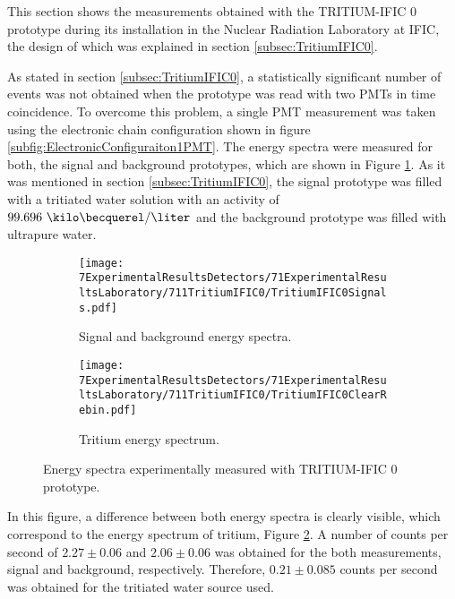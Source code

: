 This section shows the measurements obtained with the TRITIUM-IFIC 0 prototype during its installation in the Nuclear Radiation Laboratory at IFIC, the design of which was explained in section \ref{subsec:TritiumIFIC0}.

As stated in section \ref{subsec:TritiumIFIC0}, a statistically significant number of events was not obtained when the prototype was read with two PMTs in time coincidence. To overcome this problem, a single PMT measurement was taken using the electronic chain configuration shown in figure \ref{subfig:ElectronicConfiguraiton1PMT}. The energy spectra were measured for both, the signal and background prototypes, which are shown in Figure \ref{subfig:SignalBackgroundEnergySpectraTritiumIFIC0}. As it was mentioned in section \ref{subsec:TritiumIFIC0}, the signal prototype was filled with a tritiated water solution with an activity of $99.696~\kilo\becquerel/\liter$ and the background prototype was filled with ultrapure water.

\begin{figure}
\centering
    \begin{subfigure}[b]{0.73\textwidth}
    \centering
    \texttt{[image: 7ExperimentalResultsDetectors/71ExperimentalResultsLaboratory/711TritiumIFIC0/TritiumIFIC0Signals.pdf]}  
    \caption{Signal and background energy spectra.\label{subfig:SignalBackgroundEnergySpectraTritiumIFIC0}}
    \end{subfigure}
    \hfill
    \begin{subfigure}[b]{0.73\textwidth}
    \centering
    \texttt{[image: 7ExperimentalResultsDetectors/71ExperimentalResultsLaboratory/711TritiumIFIC0/TritiumIFIC0ClearRebin.pdf]}  
    \caption{Tritium energy spectrum.\label{subfig:TritiumEnergySpectraTritiumIFIC0}}
    \end{subfigure}
 \caption{Energy spectra experimentally measured with TRITIUM-IFIC 0 prototype.}
 \label{fig:EnergySpectraTRITIUMIFIC0}
\end{figure}


In this figure, a difference between both energy spectra is clearly visible, which correspond to the energy spectrum of tritium, Figure \ref{subfig:TritiumEnergySpectraTritiumIFIC0}. A number of counts per second of $2.27 \pm 0.06$ and $2.06 \pm 0.06$ was obtained for the both measurements, signal and background, respectively. Therefore, $0.21 \pm 0.085$ counts per second was obtained for the tritiated water source used.

